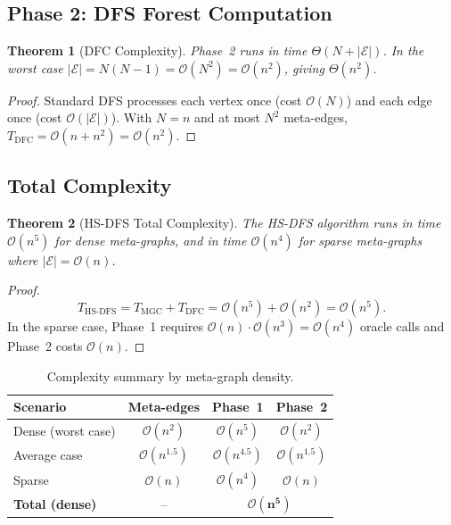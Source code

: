 ﻿\documentclass[12pt,a4paper]{article}
\theoremstyle{plain}
\newtheorem{theorem}{Theorem}[section]
\theoremstyle{definition}
\theoremstyle{remark}
\begin{document}
	\subsection{Phase 2: DFS Forest Computation}
	
	\begin{theorem}[DFC Complexity]
		\label{thm:dfc}
		Phase~2 runs in time $\Theta(N + |\mathcal{E}|)$.  In the worst case
		$|\mathcal{E}| = N(N-1) = \mathcal{O}(N^2) = \mathcal{O}(n^2)$,
		giving $\Theta(n^2)$.
	\end{theorem}
	
	\begin{proof}
		Standard DFS processes each vertex once (cost $\mathcal{O}(N)$) and
		each edge once (cost $\mathcal{O}(|\mathcal{E}|)$).  With $N = n$ and
		at most $N^2$ meta-edges, $T_{\text{DFC}} = \mathcal{O}(n + n^2)
		= \mathcal{O}(n^2)$.
	\end{proof}
	
	\subsection{Total Complexity}
	
	\begin{theorem}[HS-DFS Total Complexity]
		\label{thm:total}
		The HS-DFS algorithm runs in time $\mathcal{O}(n^5)$ for dense
		meta-graphs, and in time $\mathcal{O}(n^4)$ for sparse meta-graphs
		where $|\mathcal{E}| = \mathcal{O}(n)$.
	\end{theorem}
	
	\begin{proof}
		\[
		T_{\text{HS-DFS}} = T_{\text{MGC}} + T_{\text{DFC}}
		= \mathcal{O}(n^5) + \mathcal{O}(n^2)
		= \mathcal{O}(n^5).
		\]
		In the sparse case, Phase~1 requires $\mathcal{O}(n) \cdot \mathcal{O}(n^3)
		= \mathcal{O}(n^4)$ oracle calls and Phase~2 costs $\mathcal{O}(n)$.
	\end{proof}
	
	\begin{table}[H]
		\centering
		\caption{Complexity summary by meta-graph density.}
		\label{tab:complexity}
		\begin{tabular}{lccc}
			\toprule
			\textbf{Scenario} & \textbf{Meta-edges} & \textbf{Phase~1} & \textbf{Phase~2} \\
			\midrule
			Dense (worst case)   & $\mathcal{O}(n^2)$ & $\mathcal{O}(n^5)$ & $\mathcal{O}(n^2)$ \\
			Average case         & $\mathcal{O}(n^{1.5})$ & $\mathcal{O}(n^{4.5})$ & $\mathcal{O}(n^{1.5})$ \\
			Sparse               & $\mathcal{O}(n)$   & $\mathcal{O}(n^4)$ & $\mathcal{O}(n)$ \\
			\textbf{Total (dense)} & -- & \multicolumn{2}{c}{$\boldsymbol{\mathcal{O}(n^5)}$} \\
			\bottomrule
		\end{tabular}
	\end{table}
	
\end{document}
